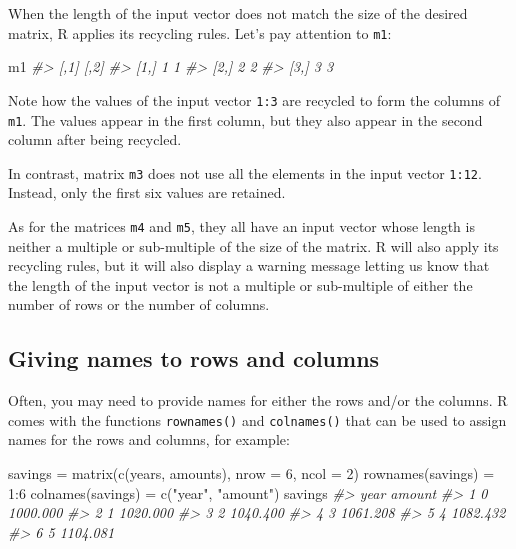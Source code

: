 \documentclass[
]{book}
\newenvironment{Shaded}{\begin{snugshade}}{\end{snugshade}}
\newcommand{\AttributeTok}[1]{\textcolor[rgb]{0.77,0.63,0.00}{#1}}
\newcommand{\CommentTok}[1]{\textcolor[rgb]{0.56,0.35,0.01}{\textit{#1}}}
\newcommand{\DecValTok}[1]{\textcolor[rgb]{0.00,0.00,0.81}{#1}}
\newcommand{\FunctionTok}[1]{\textcolor[rgb]{0.00,0.00,0.00}{#1}}
\newcommand{\NormalTok}[1]{#1}
\newcommand{\OtherTok}[1]{\textcolor[rgb]{0.56,0.35,0.01}{#1}}
\newcommand{\SpecialCharTok}[1]{\textcolor[rgb]{0.00,0.00,0.00}{#1}}
\newcommand{\StringTok}[1]{\textcolor[rgb]{0.31,0.60,0.02}{#1}}
\begin{document}
When the length of the input vector does not match the size of the desired
matrix, R applies its recycling rules. Let's pay attention to \texttt{m1}:

\begin{Shaded}
\begin{Highlighting}[]
\NormalTok{m1}
\CommentTok{\#\textgreater{}      [,1] [,2]}
\CommentTok{\#\textgreater{} [1,]    1    1}
\CommentTok{\#\textgreater{} [2,]    2    2}
\CommentTok{\#\textgreater{} [3,]    3    3}
\end{Highlighting}
\end{Shaded}

Note how the values of the input vector \texttt{1:3} are recycled to form the columns
of \texttt{m1}. The values appear in the first column, but they also appear in the
second column after being recycled.

In contrast, matrix \texttt{m3} does not use all the elements in the input vector
\texttt{1:12}. Instead, only the first six values are retained.

As for the matrices \texttt{m4} and \texttt{m5}, they all have an input vector whose
length is neither a multiple or sub-multiple of the size of the matrix. R will
also apply its recycling rules, but it will also display a warning message
letting us know that the length of the input vector is not a multiple or
sub-multiple of either the number of rows or the number of columns.

\hypertarget{giving-names-to-rows-and-columns}{%
\subsection{Giving names to rows and columns}\label{giving-names-to-rows-and-columns}}

Often, you may need to provide names for either the rows and/or the columns.
R comes with the functions \texttt{rownames()} and \texttt{colnames()} that can be used to
assign names for the rows and columns, for example:

\begin{Shaded}
\begin{Highlighting}[]
\NormalTok{savings }\OtherTok{=} \FunctionTok{matrix}\NormalTok{(}\FunctionTok{c}\NormalTok{(years, amounts), }\AttributeTok{nrow =} \DecValTok{6}\NormalTok{, }\AttributeTok{ncol =} \DecValTok{2}\NormalTok{)}
\FunctionTok{rownames}\NormalTok{(savings) }\OtherTok{=} \DecValTok{1}\SpecialCharTok{:}\DecValTok{6}
\FunctionTok{colnames}\NormalTok{(savings) }\OtherTok{=} \FunctionTok{c}\NormalTok{(}\StringTok{"year"}\NormalTok{, }\StringTok{"amount"}\NormalTok{)}
\NormalTok{savings}
\CommentTok{\#\textgreater{}   year   amount}
\CommentTok{\#\textgreater{} 1    0 1000.000}
\CommentTok{\#\textgreater{} 2    1 1020.000}
\CommentTok{\#\textgreater{} 3    2 1040.400}
\CommentTok{\#\textgreater{} 4    3 1061.208}
\CommentTok{\#\textgreater{} 5    4 1082.432}
\CommentTok{\#\textgreater{} 6    5 1104.081}
\end{Highlighting}
\end{Shaded}
\end{document}
